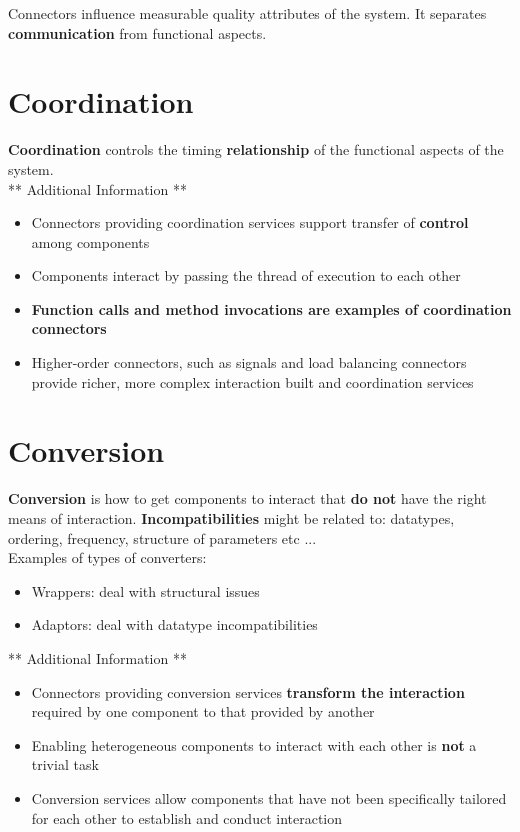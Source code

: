 \documentclass[a4paper]{report}
\begin{document}
Connectors influence measurable quality attributes of the system. It separates \textbf{communication} from functional aspects.
\section{Coordination}
\textbf{Coordination} controls the timing \textbf{relationship} of the functional aspects of the system. \\

** Additional Information ** 
\begin{itemize}
\item Connectors providing coordination services support transfer of \textbf{control} among components
\item Components interact by passing the thread of execution to each other
\item \textbf{Function calls and method invocations are examples of coordination connectors}
\item Higher-order connectors, such as signals and load balancing connectors provide richer, more complex interaction built and coordination services
\end{itemize}

\section{Conversion}
\textbf{Conversion} is how to get components to interact that \textbf{do not} have the right means of interaction. \textbf{Incompatibilities} might be related to: datatypes, ordering, frequency, structure of parameters etc ...\\

Examples of types of converters:
\begin{itemize}
\item Wrappers: deal with structural issues
\item Adaptors: deal with datatype incompatibilities\\
\end{itemize}

** Additional Information **
\begin{itemize}
\item Connectors providing conversion services \textbf{transform the interaction} required by one component to that provided by another
\item Enabling heterogeneous components to interact with each other is \textbf{not} a trivial task
\item Conversion services allow components that have not been specifically tailored for each other to establish and conduct interaction
\end{itemize}
\end{document}
